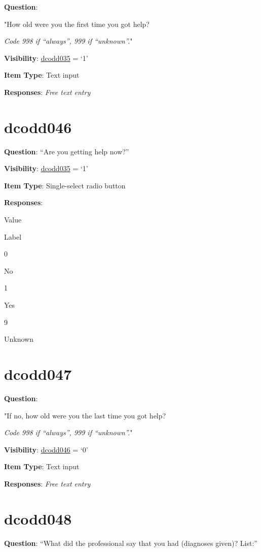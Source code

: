 \documentclass[]{book}
\begin{document}
\textbf{Question}:

"How old were you the first time you got help?

\emph{Code 998 if ``always'', 999 if ``unknown''.}"

\textbf{Visibility}: \protect\hyperlink{dcodd035}{dcodd035} = `1'

\textbf{Item Type}: Text input

\textbf{Responses}: \emph{Free text entry}

\hypertarget{dcodd046}{%
\section{dcodd046}\label{dcodd046}}

\textbf{Question}: ``Are you getting help now?''

\textbf{Visibility}: \protect\hyperlink{dcodd035}{dcodd035} = `1'

\textbf{Item Type}: Single-select radio button

\textbf{Responses}:

Value

Label

0

No

1

Yes

9

Unknown

\hypertarget{dcodd047}{%
\section{dcodd047}\label{dcodd047}}

\textbf{Question}:

"If no, how old were you the last time you got help?

\emph{Code 998 if ``always'', 999 if ``unknown''.}"

\textbf{Visibility}: \protect\hyperlink{dcodd046}{dcodd046} = `0'

\textbf{Item Type}: Text input

\textbf{Responses}: \emph{Free text entry}

\hypertarget{dcodd048}{%
\section{dcodd048}\label{dcodd048}}

\textbf{Question}: ``What did the professional say that you had (diagnoses given)? List:''
\end{document}
